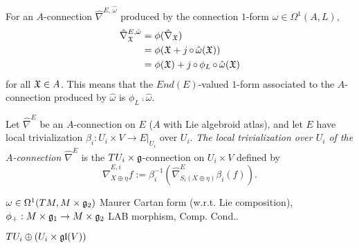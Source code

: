 For an $A$-connection $\hat \nabla^{E, \, \hat \omega}$ produced by the connection $1$-form $\hat \omega \in \Omega^1(A, L)$, 
\begin{align*}
    \hat \nabla^{E, \hat \omega}_{\oid X} &= \phi(\hat \nabla_{\oid X})\\
        &= \phi(\oid X + j \comp \hat \omega(\oid X)) \\
        &= \phi(\oid X) + j \comp \phi_L \comp \hat \omega (\oid X)
\end{align*}
for all $\mathfrak{X} \in A$. This means that the $End(E)$-valued $1$-form associated to the $A$-connection produced by $\hat \omega$ is $\phi_L \comp \hat \omega$.

\begin{definition}\label{definitionLocalTrivializationOfACOnnectionTransitiveLieAlgebroidComponents}
Let $\hat \nabla^E$ be an $A$-connection on $E$ ($A$ with Lie algebroid atlas), and let $E$ have local trivialization $\beta_i: U_i \times V\to E|_{U_i}$ over $U_i$. \emph{The local trivialization over $U_i$ of the $A$-connection $\hat \nabla^E$} is the $TU_i \times \mathfrak{g}$-connection on $U_i \times V$ defined by 
\begin{equation}
    \hat \nabla^{E, i}_{X \oplus \eta} f := \beta_i^{-1}(\hat \nabla_{S_i(X \oplus \eta)}^E \beta_i(f)).
\end{equation}
\end{definition}



\begin{example}
$\omega \in \Omega^1(TM, M \times \mathfrak{g}_2)$ Maurer Cartan form (w.r.t. Lie composition), $\phi_+: M \times \alg g_1 \to M \times \alg g_2$ LAB morphism, Comp. Cond..
\end{example}


\begin{example}
$TU_i \oplus (U_i \times \mathfrak{gl}(V))$
\end{example}


